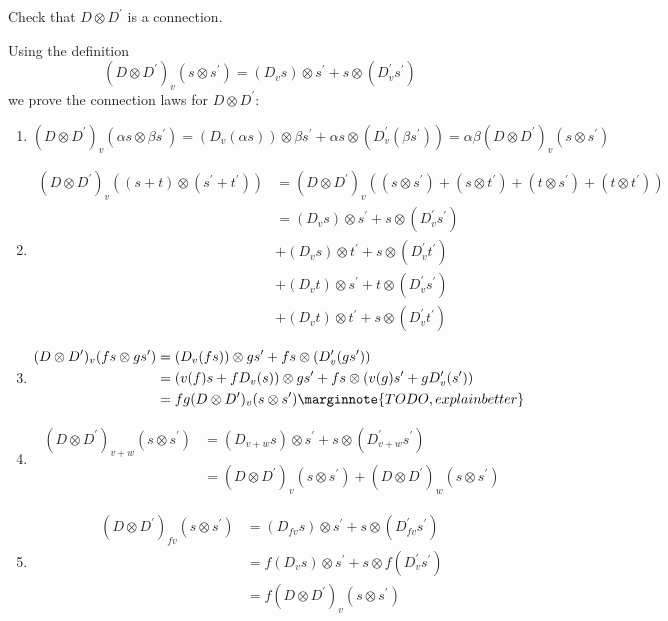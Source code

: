 \documentclass[10pt]{article}
\begin{document}
\begin{example}\label{b2e105}
	Check that $D \otimes D^\prime$ is a connection.
\end{example}
\sol Using the definition
$$
(D \otimes D^\prime)_v(s \otimes s^\prime) = (D_vs)\otimes s^\prime+s\otimes (D_v^\prime s^\prime)
$$
we prove the connection laws for $D \otimes D^\prime$:
\begin{enumerate}
	\item $(D \otimes D^\prime)_v(\alpha s \otimes \beta s^\prime)=(D_v(\alpha s))\otimes \beta s^\prime+\alpha s\otimes (D_v^\prime (\beta s^\prime))=\alpha\beta(D \otimes D^\prime)_v(s \otimes s^\prime)$
	\item $$
	\begin{aligned}
			(D \otimes D^\prime)_v((s+t) \otimes (s^\prime+t^\prime)) &= (D \otimes D^\prime)_v((s\otimes s^\prime)+(s\otimes t^\prime)+(t\otimes s^\prime)+(t \otimes t^\prime))\\
			&=(D_vs)\otimes s^\prime+s\otimes (D_v^\prime s^\prime)\\
			&+(D_vs)\otimes t^\prime+s\otimes (D_v^\prime t^\prime)\\
			&+(D_vt)\otimes s^\prime+t\otimes (D_v^\prime s^\prime)\\
			&+(D_vt)\otimes t^\prime+s\otimes (D_v^\prime t^\prime)
	\end{aligned}	
	$$
	\item $$
	\begin{aligned}
			(D \otimes D^\prime)_v(fs \otimes gs^\prime)&=(D_v(fs))\otimes gs^\prime+fs\otimes (D_v^\prime (gs^\prime))\\
			&=(v(f)s+fD_v(s))\otimes gs^\prime+fs\otimes (v(g)s^\prime+gD_v^\prime(s^\prime))\\
			&= fg(D \otimes D^\prime)_v(s \otimes s^\prime)\marginnote{TODO, explain better}
	\end{aligned}
	$$
	\item $$
	\begin{aligned}
			(D \otimes D^\prime)_{v+w}(s \otimes s^\prime)&=(D_{v+w}s)\otimes s^\prime+s\otimes (D_{v+w}^\prime s^\prime)\\
			&= (D \otimes D^\prime)_v(s \otimes s^\prime)+(D \otimes D^\prime)_w(s \otimes s^\prime)
	\end{aligned}	
	$$
	\item $$
	\begin{aligned}
		(D \otimes D^\prime)_{fv}(s \otimes s^\prime)&=(D_{fv}s)\otimes s^\prime+s\otimes (D_{fv}^\prime s^\prime)\\
		&= f(D_vs)\otimes s^\prime+s\otimes f(D_v^\prime s^\prime)\\
		&=f(D \otimes D^\prime)_v(s \otimes s^\prime)
	\end{aligned}
	$$
\end{enumerate}
\end{document}
